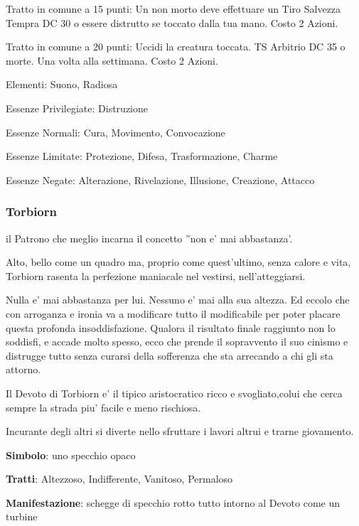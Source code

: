 \documentclass[a4paper,11pt,twoside,openany]{book}
\begin{document}
{		Tratto in comune a 15 punti: Un non morto deve effettuare un Tiro Salvezza Tempra DC 30 o essere distrutto se toccato dalla tua mano. Costo 2 Azioni.
		
		Tratto in comune a 20 punti: Uccidi la creatura toccata. TS Arbitrio DC 35 o morte. Una volta alla settimana. Costo 2 Azioni.
		
		\bigskip
		
		Elementi: Suono, Radiosa
		
		\bigskip
		
		Essenze Privilegiate: Distruzione
		
		Essenze Normali: Cura, Movimento, Convocazione
		
		Essenze Limitate: Protezione, Difesa, Trasformazione, Charme
		
		Essenze Negate: Alterazione, Rivelazione, Illusione, Creazione, Attacco
		
		\subsubsection{Torbiorn}
		
		\label{torbiorn}
		
		il Patrono che meglio incarna il concetto ''non e' mai abbastanza'.
		
		Alto, bello come un quadro ma, proprio come quest'ultimo, senza calore e vita, Torbiorn rasenta la perfezione maniacale nel vestirsi, nell'atteggiarsi.
		
		Nulla e' mai abbastanza per lui. Nessuno e' mai alla sua altezza. Ed eccolo che con arroganza e ironia va a modificare tutto il modificabile per poter placare questa profonda insoddisfazione. Qualora il risultato finale raggiunto non lo soddisfi, e accade molto spesso, ecco che prende il sopravvento il suo cinismo e distrugge tutto senza curarsi della sofferenza che sta arrecando a chi gli sta attorno.
		
		Il Devoto di Torbiorn e' il tipico aristocratico ricco e svogliato,colui che cerca sempre la strada piu' facile e meno rischiosa.
		
		Incurante degli altri si diverte nello sfruttare i lavori altrui e trarne giovamento.
		
		\textbf{Simbolo}: uno specchio opaco
		
		\textbf{Tratti}: Altezzoso, Indifferente, Vanitoso, Permaloso
		
		\textbf{Manifestazione}: schegge di specchio rotto tutto intorno al Devoto come un turbine
		
}
\end{document}
